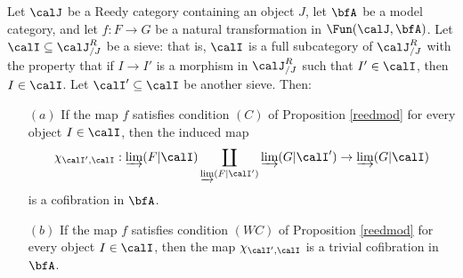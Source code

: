 \begin{lemma}\label{jackal}
Let $\calJ$ be a Reedy category containing an object $J$, let $\bfA$ be a model category, and let $f: F \rightarrow G$ be a natural transformation in $\Fun(\calJ, \bfA)$.
Let $\calI \subseteq \calJ^{R}_{/J}$ be a sieve: that is, $\calI$ is a full subcategory
of $\calJ^{R}_{/J}$ with the property that if $I \rightarrow I'$ is a morphism in
$\calJ^{R}_{/J}$ such that $I' \in \calI$, then $I \in \calI$. Let $\calI' \subseteq \calI$ be another sieve. Then:
\begin{itemize}
\item[$(a)$] If the map $f$ satisfies condition $(C)$ of Proposition \ref{reedmod} for every object $I \in \calI$, then
the induced map
$$ \chi_{\calI', \calI}: \varinjlim( F | \calI) \coprod_{ \varinjlim(F | \calI') } \varinjlim( G | \calI')
\rightarrow \varinjlim( G | \calI )$$
is a cofibration in $\bfA$.
\item[$(b)$] If the map $f$ satisfies condition $(WC)$ of Proposition \ref{reedmod} for every object $I \in \calI$, then the map $\chi_{\calI', \calI}$ is a trivial cofibration in $\bfA$.
\end{itemize}
\end{lemma}

